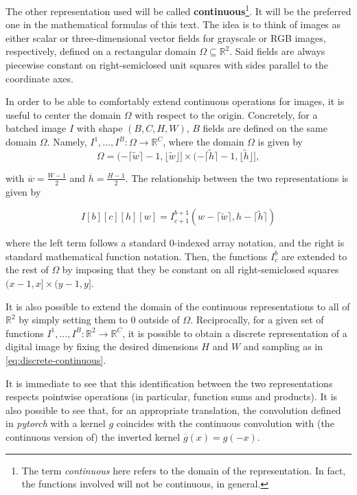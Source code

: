 \documentclass[twocolumn,twoside,a4paper,10pt]{IEEEtran}
\begin{document}
The other representation used will be called \textbf{continuous}\footnote{The term \textit{continuous} here refers to the domain of the representation. In fact, the functions involved will not be continuous, in general.}. It will be the preferred one in the mathematical formulas of this text. The idea is to think of images as either scalar or three-dimensional vector fields for grayscale or RGB images, respectively, defined on a rectangular domain \(\Omega\subseteq \mathbb{R}^2\). Said fields are always piecewise constant on right-semiclosed unit squares with sides parallel to the coordinate axes.

In order to be able to comfortably extend continuous operations for images, it is useful to center the domain \(\Omega\) with respect to the origin. Concretely, for a batched image \(I\) with shape \((B, C, H, W)\), \(B\)  fields are defined on the same domain \(\Omega\). Namely, \(I^1, \dots, I^B\colon\Omega\to \mathbb{R}^C\), where the domain \(\Omega\) is given by
\[
  \Omega = (-\lceil \tilde{w}\rceil - 1, \lfloor \tilde{w}\rfloor]\times(-\lceil \tilde{h}\rceil -1, \lfloor \tilde{h}\rfloor]
,\]

with \(\overline{w}=\frac{W-1}{2}\) and \(\overline{h}=\frac{H-1}{2}\). The relationship between the two representations is given by

\begin{equation}\label{eq:discrete-continuous}
  I[b][c][h][w] = I^{b+1}_{c+1}(w - \lceil\tilde{w}\rceil, h - \lceil\tilde{h}\rceil)
\end{equation}

where the left term follows a standard \(0\)-indexed array notation, and the right is standard mathematical function notation. Then, the functions \(I^b_c\) are extended to the rest of \(\Omega\) by imposing that they be constant on all right-semiclosed squares \((x-1,x]\times(y-1, y]\).

It is also possible to extend the domain of the continuous representations to all of \(\mathbb{R}^2\) by simply setting them to \(0\) outside of \(\Omega\). Reciprocally, for a given set of functions \(I^1, \dots, I^B\colon \mathbb{R}^2\to \mathbb{R}^C\), it is possible to obtain a discrete representation of a digital image by fixing the desired dimensions \(H\) and \(W\) and sampling as in \cref{eq:discrete-continuous}.

It is immediate to see that this identification between the two representations respects pointwise operations (in particular, function sums and products). It is also possible to see that, for an appropriate translation, the convolution defined in \textit{pytorch} with a kernel \(g\) coincides with the continuous convolution with (the continuous version of) the inverted kernel \(\overline{g}(x) = g(-x)\).
\end{document}
